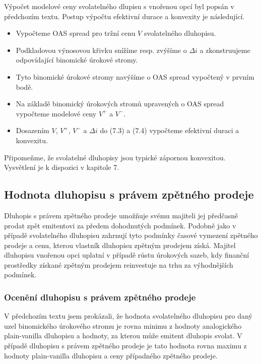 \documentclass[a4paper]{book}
\begin{document}
Výpočet modelové ceny svolatelného dlupisu s vnořenou opcí byl popsán v předchozím textu. Postup výpočtu efektivní durace a konvexity je následující.
\begin{itemize}
\item Vypočteme OAS spread pro tržní cenu $V$ svolatelného dluhopisu.
\item Podkladovou výnosovou křivku snížíme resp. zvýšíme o $\Delta i$ a zkonstruujeme odpovídající binomické úrokové stromy.
\item Tyto binomické úrokové stromy navýšíme o OAS spread vypočtený v prvním bodě.
\item Na základě binomický úrokových stromů upravených o OAS spread vypočteme modelové ceny $V^{+}$ a $V^{-}$.
\item Dosazením $V$, $V^{+}$, $V^{-}$ a $\Delta i$ do (7.3) a (7.4) vypočteme efektivní duraci a konvexitu.
\end{itemize}
Připomeňme, že svolatelné dluhopisy jsou typické zápornou konvexitou. Vysvětlení je k dispozici v kapitole 7.

\subsection{Hodnota dluhopisu s právem zpětného prodeje}

Dluhopis s právem zpětného prodeje umožňuje svému majiteli jej předčasně prodat zpět emitentovi za předem dohodnutých podmínek. Podobně jako v případě svolatelného dluhopisu zahrnují tyto podmínky časové vymezení zpětného prodeje a cenu, kterou vlastník dluhopisu zpětným prodejem získá. Majitel dluhopisu vnořenou opci uplatní v případě růstu úrokových sazeb, kdy finanční prostředky získané zpětným prodejem reinvestuje na trhu za výhodnějších podmínek.

\subsubsection{Ocenění dluhopisu s právem zpětného prodeje}

V předchozím textu jsem prokázali, že hodnota svolatelného dluhopisu pro daný uzel binomického úrokového stromu je rovna minimu z hodnoty analogického plain-vanilla dluhopisu a hodnoty, za kterou může emitent dluhopis svolat. V případě dluhopisu s právem zpětného prodeje je tato hodnota rovna maximu z hodnoty plain-vanilla dluhopisu a ceny případného zpětného prodeje.
\end{document}
